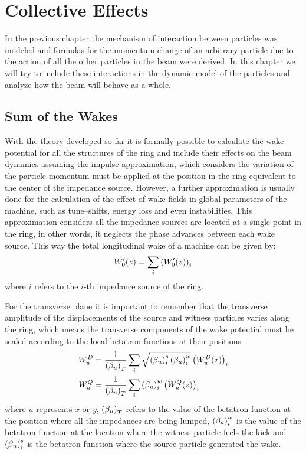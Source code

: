 \chapter{Collective Effects}\label{cap:collective_effects}

    In the previous chapter the mechanism of interaction between particles was modeled and formulas for the momentum change of an arbitrary particle due to the action of all the other particles in the beam were derived. In this chapter we will try to include these interactions in the dynamic model of the particles and analyze how the beam will behave as a whole.

\section{Sum of the Wakes}\label{sec:sum_of_wakes}

    With the theory developed so far it is formally possible to calculate the wake potential for all the structures of the ring and include their effects on the beam dynamics assuming the impulse approximation, which considers the variation of the particle momentum must be applied at the position in the ring equivalent to the center of the impedance source. However, a further approximation is usually done for the calculation of the effect of wake-fields in global parameters of the machine, such as tune--shifts, energy loss and even instabilities. This approximation considers all the impedance sources are located at a single point in the ring, in other words, it neglects the phase advances between each wake source. This way the total longitudinal wake of a machine can be given by:
    \begin{align}\label{eq:scaling_longitudinal}
        W'_0(z) = \sum_i \left(W'_0(z)\right)_i
    \end{align}
    where $i$ refers to the $i$-th impedance source of the ring.

    For the transverse plane it is important to remember that the transverse amplitude of the displacements of the source and witness particles varies along the ring, which means the transverse components of the wake potential must be scaled according to the local betatron functions at their positions
    \begin{align}\label{eq:scaling_transverse_general}\nonumber
        W_u^D &=\frac{1}{\left(\beta_u\right)_T} \sum_i \sqrt{\left(\beta_u\right)_i^s\left(\beta_u\right)_i^w}\left(W_u^D(z)\right)_i \\
        W_u^Q &=\frac{1}{\left(\beta_u\right)_T} \sum_i \left(\beta_u\right)_i^w\left(W_u^Q(z)\right)_i
    \end{align}
    where $u$ represents $x$ or $y$, $\left(\beta_u\right)_T$ refers to the value of the betatron function at the position where all the impedances are being lumped, $\left(\beta_u\right)_i^w$ is the value of the betatron function at the location where the witness particle feels the kick and $\left(\beta_u\right)_i^s$ is the betatron function where the source particle generated the wake.

